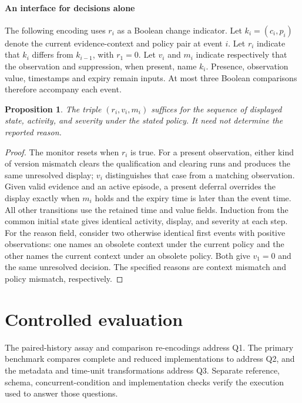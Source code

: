 \documentclass[preprint,11pt]{elsarticle}
\newtheorem{proposition}{Proposition}
\begin{document}
\paragraph{An interface for decisions alone}
The following encoding uses $r_i$ as a Boolean change indicator. Let $k_i=(c_i,p_i)$ denote the current evidence-context and policy pair at event $i$. Let $r_i$ indicate that $k_i$ differs from $k_{i-1}$, with $r_1=0$. Let $v_i$ and $m_i$ indicate respectively that the observation and suppression, when present, name $k_i$. Presence, observation value, timestamps and expiry remain inputs. At most three Boolean comparisons therefore accompany each event.
\begin{proposition}
The triple $(r_i,v_i,m_i)$ suffices for the sequence of displayed state, activity, and severity under the stated policy. It need not determine the reported reason.
\end{proposition}
\begin{proof}
The monitor resets when $r_i$ is true. For a present observation, either kind of version mismatch clears the qualification and clearing runs and produces the same unresolved display; $v_i$ distinguishes that case from a matching observation. Given valid evidence and an active episode, a present deferral overrides the display exactly when $m_i$ holds and the expiry time is later than the event time. All other transitions use the retained time and value fields. Induction from the common initial state gives identical activity, display, and severity at each step. For the reason field, consider two otherwise identical first events with positive observations: one names an obsolete context under the current policy and the other names the current context under an obsolete policy. Both give $v_1=0$ and the same unresolved decision. The specified reasons are context mismatch and policy mismatch, respectively.
\end{proof}

\section{Controlled evaluation}
The paired-history assay and comparison re-encodings address Q1. The primary benchmark compares complete and reduced implementations to address Q2, and the metadata and time-unit transformations address Q3. Separate reference, schema, concurrent-condition and implementation checks verify the execution used to answer those questions.
\end{document}

